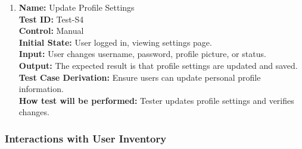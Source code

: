 \documentclass[12pt, titlepage]{article}
\begin{document}
\begin{enumerate}
  \item \textbf{Name:} {Update Profile Settings} \label{itm:Test-S4}\\
        \textbf{Test ID:} Test-S4\\
        \textbf{Control:} Manual \\
        \textbf{Initial State:} User logged in, viewing settings page. \\
        \textbf{Input:} User changes username, password, profile picture, or status. \\
        \textbf{Output:} The expected result is that profile settings are updated and saved. \\
        \textbf{Test Case Derivation:} Ensure users can update personal profile information. \\
        \textbf{How test will be performed:} Tester updates profile settings and verifies changes.

\end{enumerate}

\subsubsection{Interactions with User Inventory}
\end{document}
